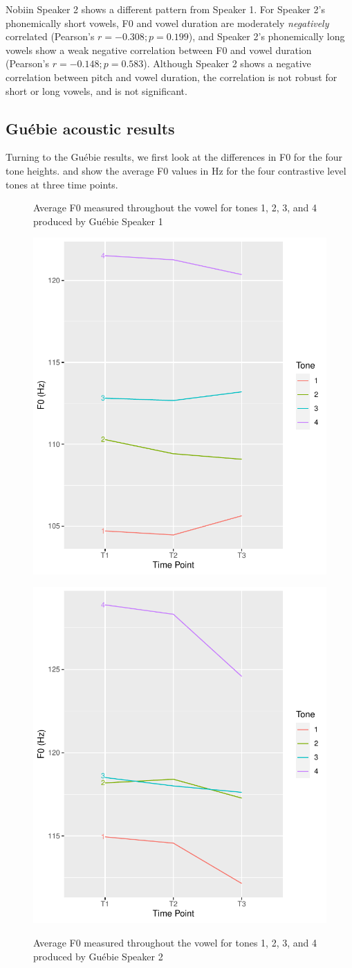 \documentclass[output=paper]{langscibook}
\begin{document}
Nobiin Speaker 2 shows a different pattern from Speaker 1. For Speaker 2's phonemically short vowels, F0 and vowel duration are moderately \textit{negatively} correlated (Pearson's $r= -0.308; p=0.199$), and Speaker 2's phonemically long vowels show a weak negative correlation between F0 and vowel duration (Pearson's $r= -0.148; p=0.583$). Although Speaker 2 shows a negative correlation between pitch and vowel duration, the correlation is not robust for short or long vowels, and is not significant.

\subsection{Guébie acoustic results}
Turning to the Guébie results, we first look at the differences in F0 for the four tone heights.  and  show the average F0 values in Hz for the four contrastive level tones at three time points.  


\begin{figure}
\begin{floatrow}
 \captionsetup{margin=.05\linewidth}
 \ffigbox
 {\caption{Average F0 measured throughout the vowel for tones 1, 2, 3, and 4 produced by Guébie Speaker 1\label{fig:oakley:olivierTonePitch}}}
 {\includegraphics[width=.5\textwidth]{figures/olivierTonePitch.pdf}}%
 \ffigbox
 {\caption{Average F0 measured throughout the vowel for tones 1, 2, 3, and 4 produced by Guébie Speaker 2\label{fig:oakley:borisTonePitch}}}
 {\includegraphics[width=.5\textwidth]{figures/borisTonePitch.pdf}}
\end{floatrow}
\end{figure}
\end{document}
